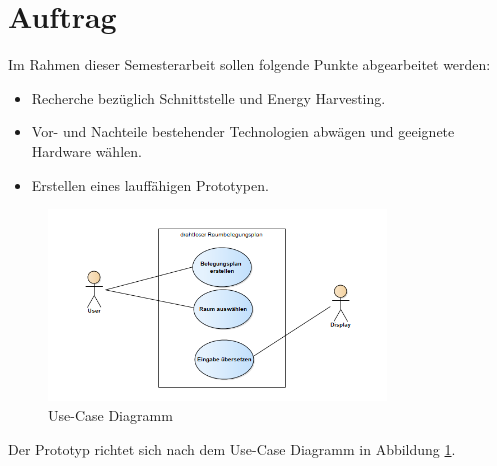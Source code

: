 \section{Auftrag}
\label{sec:generalProvision}

Im Rahmen dieser Semesterarbeit sollen folgende Punkte abgearbeitet werden:
\begin{itemize}
	\item Recherche bezüglich Schnittstelle und Energy Harvesting.	
	\item Vor- und Nachteile bestehender Technologien abwägen und geeignete Hardware wählen.	
	\item Erstellen eines lauffähigen Prototypen.
\end{itemize}

\begin{figure}[h]
	\centering
	\includegraphics[width=0.8\textwidth]{./Use-Case-Model.png}
	\caption{Use-Case Diagramm\label{use-case}}
\end{figure}

Der Prototyp richtet sich nach dem Use-Case Diagramm in Abbildung \ref{use-case}.